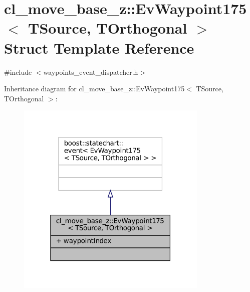\hypertarget{structcl__move__base__z_1_1EvWaypoint175}{}\section{cl\+\_\+move\+\_\+base\+\_\+z\+:\+:Ev\+Waypoint175$<$ T\+Source, T\+Orthogonal $>$ Struct Template Reference}
\label{structcl__move__base__z_1_1EvWaypoint175}


{\ttfamily \#include $<$waypoints\+\_\+event\+\_\+dispatcher.\+h$>$}



Inheritance diagram for cl\+\_\+move\+\_\+base\+\_\+z\+:\+:Ev\+Waypoint175$<$ T\+Source, T\+Orthogonal $>$\+:
\nopagebreak
\begin{figure}[H]
\begin{center}
\leavevmode
\includegraphics[width=259pt]{structcl__move__base__z_1_1EvWaypoint175__inherit__graph}
\end{center}
\end{figure}


